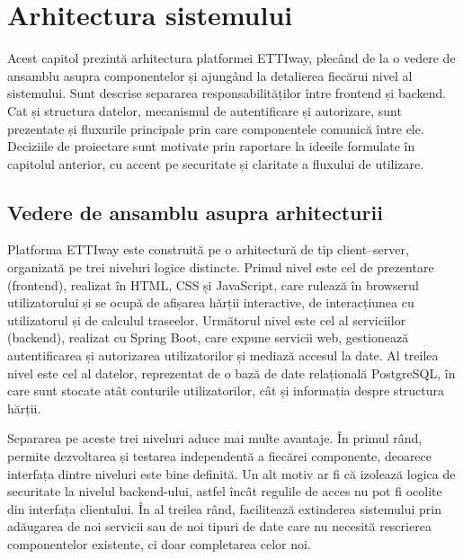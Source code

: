 

\chapter{Arhitectura sistemului}
\label{cap:arhitectura}

Acest capitol prezintă arhitectura platformei ETTIway, plecând de la o vedere de
ansamblu asupra componentelor și ajungând la detalierea fiecărui nivel al
sistemului. Sunt descrise separarea responsabilităților între frontend și
backend. Cat și structura datelor, mecanismul de autentificare și
autorizare, sunt prezentate și fluxurile principale prin care componentele comunică între
ele. Deciziile de proiectare sunt motivate prin raportare la ideeile
formulate în capitolul anterior, cu accent pe securitate și
claritate a fluxului de utilizare. 


\section{Vedere de ansamblu asupra arhitecturii}
\label{sec:ansamblu}

Platforma ETTIway este construită pe o arhitectură de tip client–server,
organizată pe trei niveluri logice distincte. Primul nivel este cel de
prezentare (frontend), realizat în HTML, CSS și JavaScript, care rulează în
browserul utilizatorului și se ocupă de afișarea hărții interactive, de
interacțiunea cu utilizatorul și de calculul traseelor. Următorul nivel este
cel al serviciilor (backend), realizat cu Spring Boot, care expune servicii
web, gestionează autentificarea și autorizarea utilizatorilor și mediază
accesul la date. Al treilea nivel este cel al datelor, reprezentat de o bază
de date relațională PostgreSQL, în care sunt stocate atât conturile
utilizatorilor, cât și informația despre structura hărții.

Separarea pe aceste trei niveluri aduce mai multe avantaje. În primul rând,
permite dezvoltarea și testarea independentă a fiecărei componente, deoarece
interfața dintre niveluri este bine definită. Un alt motiv ar fi că izolează
logica de securitate la nivelul backend-ului, astfel încât regulile de acces
nu pot fi ocolite din interfața clientului. În al treilea rând, facilitează
extinderea sistemului prin adăugarea de noi servicii sau de noi tipuri de date care nu
necesită rescrierea componentelor existente, ci doar completarea celor noi.

